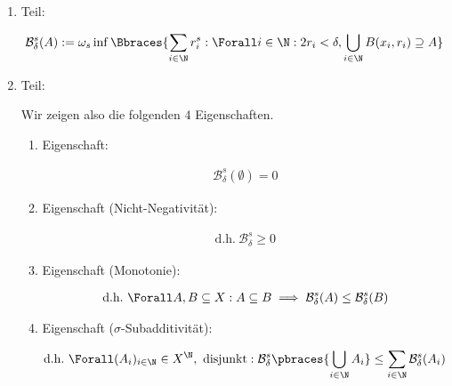 \begin{solution}

\phantom{}

\begin{enumerate}[label = \arabic*.]

    \item Teil:
    
    \begin{align*}
        \mathcal{B}_\delta^s(A)
        :=
        \omega_s
        \inf
        \Bbraces
        {
            \sum_{i \in \N}
                r_i^s:
            \Forall i \in \N:
                2 r_i < \delta,
            \bigcup_{i \in \N}
                B(x_i, r_i)
            \supseteq
            A
        }
    \end{align*}

    \item Teil:
    
    Wir zeigen also die folgenden $4$ Eigenschaften.
    
    \begin{enumerate}[label = \arabic*.]

        \item Eigenschaft:
        
        \begin{align*}
            \mathcal{B}_\delta^s(\emptyset) = 0
        \end{align*}

        \item Eigenschaft (Nicht-Negativität):
        
        \begin{align*}
            \text{d.h.}~
            \mathcal{B}_\delta^s \geq 0
        \end{align*}

        \item Eigenschaft (Monotonie):
        
        \begin{align*}
            \text{d.h.}~
            \Forall A, B \subseteq X:
                A \subseteq B
                \implies
                \mathcal{B}_\delta^s(A) \leq \mathcal{B}_\delta^s(B)
        \end{align*}

        \item Eigenschaft ($\sigma$-Subadditivität):
        
        \begin{align*}
            \text{d.h.}~
            \Forall (A_i)_{i \in \N} \in X^\N, ~\text{disjunkt}:
                \mathcal{B}_\delta^s
                \pbraces
                {
                    \bigcup_{i \in \N}
                        A_i
                }
                \leq
                \sum_{i \in \N}
                    \mathcal{B}_\delta^s(A_i)
        \end{align*}


\end{enumerate}
\end{enumerate}
\end{solution}
